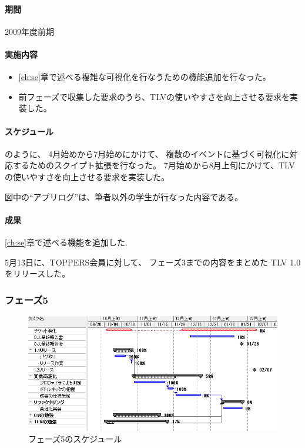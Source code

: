\paragraph{期間} 2009年度前期

\paragraph{実施内容}
\begin{itemize}
\item \ref{ch:se}章で述べる複雑な可視化を行なうための機能追加を行なった。
\item 前フェーズで収集した要求のうち、TLVの使いやすさを向上させる要求を実装した。
\end{itemize}

\paragraph{スケジュール} のように、
4月始めから7月始めにかけて、
複数のイベントに基づく可視化に対応するためのスクイプト拡張を行なった。
7月始めから8月上旬にかけて、TLVの使いやすさを向上させる要求を実装した。

図中の``アプリログ''は、筆者以外の学生が行なった内容である。

\paragraph{成果}
\ref{ch:se}章で述べる機能を追加した.

5月13日に、TOPPERS会員に対して、
フェーズ3までの内容をまとめた
TLV 1.0をリリースした。

\subsubsection{フェーズ5}
\begin{figure}
\centering
\includegraphics[width=\textwidth]{schedule5.png}
\caption{フェーズ5のスケジュール}\label{fig:sch5}
\end{figure}


